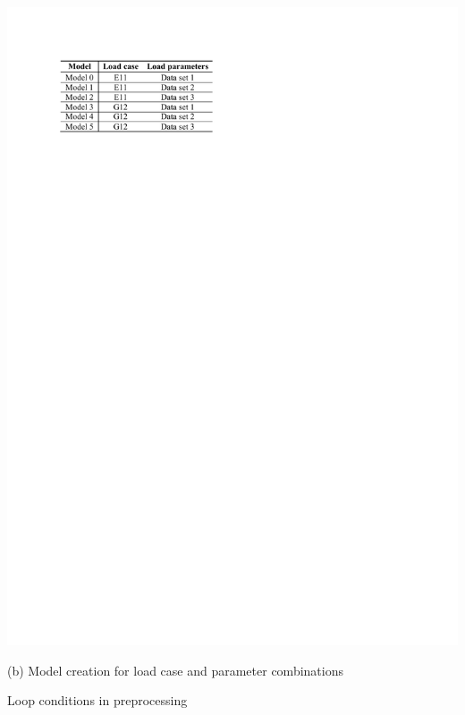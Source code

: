 \begin{table}[H]
\begin{minipage}[T!]{1.0\textwidth}
\begin{minipage}[T!][5.3cm][T!]{0.43\textwidth}
            \includegraphics[width=1.0\textwidth]{ModelCombinations.pdf}
            \vfill{}
            \caption*{(b) Model creation for load case and parameter combinations}
            \label{tab:modelCombinations}
        \end{minipage}
    \end{minipage}    
    \caption{Loop conditions in preprocessing}
    \label{tab:ModelSettings}
\end{table}

